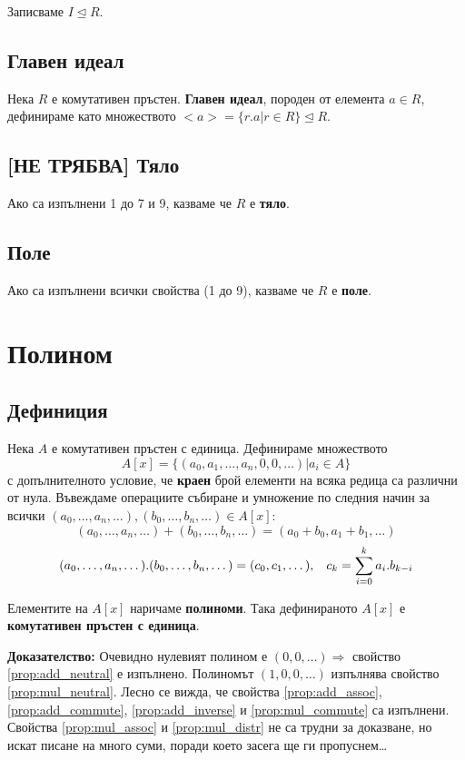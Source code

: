 \documentclass[fleqn,12pt]{article}
\begin{document}
Записваме $I \trianglelefteq R$.

\subsection{Главен идеал}
Нека $R$ е комутативен пръстен. \textbf{Главен идеал}, породен от елемента $a \in R$,
дефинираме като множеството $<a> = \{r.a | r \in R\} \trianglelefteq R$.

\subsection{[НЕ ТРЯБВА] Тяло}
Ако са изпълнени 1 до 7 и 9, казваме че $R$ е \textbf{тяло}.

\subsection{Поле}
Ако са изпълнени всички свойства (1 до 9), казваме че $R$ е \textbf{поле}.

\section{Полином}
\subsection{Дефиниция}
Нека $A$ е комутативен пръстен с единица.
Дефинираме множеството 
\[ A[x] = \{(a_0, a_1, \dots, a_n, 0, 0, \dots) | a_i \in A \} \] 
с
допълнителното условие, че \textbf{краен} брой елементи на всяка редица са различни от нула.
Въвеждаме операциите събиране и умножение по следния начин за всички $(a_0, \dots, a_n, \dots), (b_0, \dots, b_n, \dots) \in A[x]$:
\[(a_0, \dots, a_n, \dots) + (b_0, \dots, b_n, \dots) = (a_0 + b_0, a_1 + b_1, \dots) \]
\[(a_0, \dots, a_n, \dots) . (b_0, \dots, b_n, \dots) = (c_0, c_1, \dots), \hspace{3mm}
c_k = \sum_{i=0}^{k} a_i . b_{k - i} \]

Елементите на $A[x]$ наричаме \textbf{полиноми}. Така дефинираното $A[x]$ е \textbf{комутативен пръстен с единица}.

\textbf{Доказателство:} Очевидно нулевият полином е $(0, 0, \dots) \Rightarrow$ свойство \ref{prop:add_neutral} е изпълнено.
Полиномът $(1, 0, 0, \dots)$ изпълнява свойство \ref{prop:mul_neutral}. Лесно се вижда, че свойства \ref{prop:add_assoc}, \ref{prop:add_commute}, 
\ref{prop:add_inverse} и \ref{prop:mul_commute} са изпълнени. Свойства \ref{prop:mul_assoc} и \ref{prop:mul_distr} не са трудни за доказване, 
но искат писане на много суми, поради което засега ще ги пропуснем\dots
\end{document}

